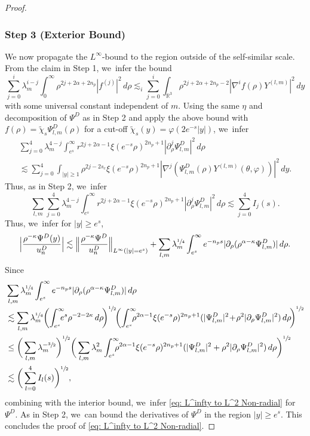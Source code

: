 \documentclass[JEP,XML,SOM,Unicode]{cedram}
\theoremstyle{plain}
\theoremstyle{definition}
\begin{document}
\begin{proof}
\subsubsection*{Step 3 (Exterior Bound)}
We now propagate the $L^\infty$-bound to the region outside of the self-similar scale. From the claim in Step 1, we~infer the bound\vspace*{-3pt}
\[
\sum_{j=0}^i\lambda_m^{i-j}\int_0^\infty \rho^{2j+2\alpha+2n_p}|f^{(j)}|^2\,d\rho\lesssim_i\sum_{j=0}^i\int_{\mathbb R^3}\rho^{2j+2\alpha+2n_p-2}|\nabla^i f(\rho)Y^{(l,m)}|^2\,dy
\]
with some universal constant independent of $m$. Using the same $\eta$ and decomposition of $\Psi^D$ as in Step 2 and apply the above bound with $f(\rho)=\tilde \chi_s\Psi_{l,m}^D(\rho)$ for a cut-off $\tilde \chi_s(y)=\varphi(2e^{-s}|y|)$, we~infer\vspace*{-5pt}
\begin{multline*}
\sum_{j=0}^{4}\lambda_m^{4-j}\int_{e^s}^\infty r^{2j+2\alpha-1}\xi(e^{-s}\rho)^{2n_p+1}|\partial_\rho^j \Psi_{l,m}^D|^2\,d\rho\\[-5pt]
\lesssim \sum_{j=0}^4\int_{|y|\ge1}\rho^{2j-2s_c}\xi(e^{-s}\rho)^{2n_p+1}|\nabla^j(\Psi_{l,m}^D(\rho)Y^{(l,m)}(\theta,\varphi))|^2\,dy.
\end{multline*}
Thus, as in Step 2, we~infer\vspace*{-3pt}
\[
\sum_{l,m}\sum_{j=0}^{4}\lambda_m^{4-j}\int_{e^s}^\infty r^{2j+2\alpha-1}\xi(e^{-s}\rho)^{2n_p+1}|\partial_\rho^j \Psi_{l,m}^D|^2\,d\rho\lesssim\sum_{j=0}^4I_j(s).
\]
Thus, we~infer for $|y|\ge e^s$,\vspace*{-3pt}
\[
\Big|\frac{\rho^{-\kappa}\Psi^D(y)}{u_n^D}\Big|\lesssim \Big\Vert \frac{\rho^{-\kappa}\Psi^D}{u_n^D}\Big\Vert_{L^\infty(|y|=e^s)}+\sum_{l,m}\lambda_m^{\sfrac{1}{4}}\int_{e^s}^\infty e^{-n_ps}|\partial_\rho(\rho^{\alpha-\kappa}\Psi_{l,m}^D)|\,d\rho.
\]
Since
\[
\begin{aligned}
&\sum_{l,m}\lambda_m^{\sfrac{1}{4}}\int_{e^s}^\infty e^{-n_ps}|\partial_\rho(\rho^{\alpha-\kappa}\Psi_{l,m}^D)|\,d\rho\\[-3pt]
&\lesssim\sum_{l,m}\lambda_m^{\sfrac{1}{4}}\bigg(\!\int_{e^s}^\infty\hspace*{-2.5mm} e^s\rho^{-2-2\kappa}\,d\rho\!\bigg)^{\sfrac{1}{2}}\!\bigg(\!\int_{e^s}^\infty\hspace*{-2.5mm}\rho^{2\alpha-1}\xi(e^{-s}\rho)^{2n_p+1}(|\Psi_{l,m}^D|^2\!+\!\rho^2|\partial_\rho\Psi_{l,m}^D|^2)\,d\rho\!\bigg)^{\sfrac{1}{2}}\\
&\le \bigg(\sum_{l,m} \lambda_m^{-\sfrac{3}{2}}\bigg)^{\sfrac{1}{2}}\bigg(\sum_{l,m}\lambda_m^2\int_{e^s}^\infty\hspace*{-2.5mm} \rho^{2\alpha-1}\xi(e^{-s}\rho)^{2n_p+1}(|\Psi_{l,m}^D|^2+\rho^2|\partial_\rho\Psi_{l,m}^D|^2)\,d\rho\bigg)^{\sfrac{1}{2}}\\
&\lesssim \bigg(\sum_{l=0}^4I_l(s)\bigg)^{\sfrac{1}{2}},
\end{aligned}
\]
combining with the interior bound, we~infer \eqref{eq: L^infty to L^2 Non-radial} for $\Psi^D$. As in Step 2, we~can bound the derivatives of $\Psi^D$ in the region $|y|\ge e^s$. This concludes the proof of \eqref{eq: L^infty to L^2 Non-radial}.
\end{proof}
\end{document}
